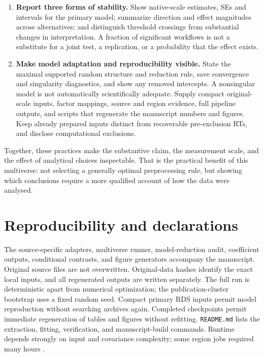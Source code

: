 \begin{enumerate}
\item \textbf{Report three forms of stability.}
Show native-scale estimates, SEs and intervals for the primary model;
summarize direction and effect magnitudes across alternatives; and distinguish
threshold crossings from substantial changes in interpretation. A fraction
of significant workflows is not a substitute for a joint test, a replication,
or a probability that the effect exists.

\item \textbf{Make model adaptation and reproducibility visible.}
State the maximal supported random structure and reduction rule, save
convergence and singularity diagnostics, and show any removed intercepts.
A nonsingular model is not automatically scientifically adequate. Supply
compact original-scale inputs, factor mappings, source and region evidence,
full pipeline outputs, and scripts that regenerate the manuscript numbers
and figures. Keep already prepared inputs distinct from recoverable
pre-exclusion RTs, and disclose computational exclusions.
\end{enumerate}

Together, these practices make the substantive claim, the measurement
scale, and the effect of analytical choices inspectable. That is the
practical benefit of this multiverse: not selecting a generally optimal
preprocessing rule, but showing which conclusions require a more
qualified account of how the data were analysed.

\section{Reproducibility and declarations}

The source-specific adapters, multiverse runner, model-reduction audit,
coefficient outputs, conditional contrasts, and figure generators accompany
the manuscript. Original source files are not overwritten. Original-data
hashes identify the exact local inputs, and all regenerated outputs are
written separately. The full run is deterministic apart from numerical
optimization; the publication-cluster bootstrap uses a fixed random seed.
Compact primary RDS inputs permit model reproduction without searching
archives again. Completed checkpoints permit immediate regeneration of tables
and figures without refitting. \texttt{README.md} lists the extraction,
fitting, verification, and manuscript-build commands. Runtime depends strongly
on input and covariance complexity; some region jobs required many hours%
.

